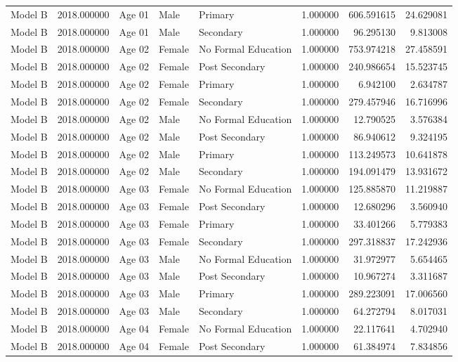 \begin{table}[ht]
\begin{tabular}{lrlllrrr}
Model B & 2018.000000 & Age 01 & Male & Primary & 1.000000 & 606.591615 & 24.629081 \\
Model B & 2018.000000 & Age 01 & Male & Secondary & 1.000000 & 96.295130 & 9.813008 \\
Model B & 2018.000000 & Age 02 & Female & No Formal Education & 1.000000 & 753.974218 & 27.458591 \\
Model B & 2018.000000 & Age 02 & Female & Post Secondary & 1.000000 & 240.986654 & 15.523745 \\
Model B & 2018.000000 & Age 02 & Female & Primary & 1.000000 & 6.942100 & 2.634787 \\
Model B & 2018.000000 & Age 02 & Female & Secondary & 1.000000 & 279.457946 & 16.716996 \\
Model B & 2018.000000 & Age 02 & Male & No Formal Education & 1.000000 & 12.790525 & 3.576384 \\
Model B & 2018.000000 & Age 02 & Male & Post Secondary & 1.000000 & 86.940612 & 9.324195 \\
Model B & 2018.000000 & Age 02 & Male & Primary & 1.000000 & 113.249573 & 10.641878 \\
Model B & 2018.000000 & Age 02 & Male & Secondary & 1.000000 & 194.091479 & 13.931672 \\
Model B & 2018.000000 & Age 03 & Female & No Formal Education & 1.000000 & 125.885870 & 11.219887 \\
Model B & 2018.000000 & Age 03 & Female & Post Secondary & 1.000000 & 12.680296 & 3.560940 \\
Model B & 2018.000000 & Age 03 & Female & Primary & 1.000000 & 33.401266 & 5.779383 \\
Model B & 2018.000000 & Age 03 & Female & Secondary & 1.000000 & 297.318837 & 17.242936 \\
Model B & 2018.000000 & Age 03 & Male & No Formal Education & 1.000000 & 31.972977 & 5.654465 \\
Model B & 2018.000000 & Age 03 & Male & Post Secondary & 1.000000 & 10.967274 & 3.311687 \\
Model B & 2018.000000 & Age 03 & Male & Primary & 1.000000 & 289.223091 & 17.006560 \\
Model B & 2018.000000 & Age 03 & Male & Secondary & 1.000000 & 64.272794 & 8.017031 \\
Model B & 2018.000000 & Age 04 & Female & No Formal Education & 1.000000 & 22.117641 & 4.702940 \\
Model B & 2018.000000 & Age 04 & Female & Post Secondary & 1.000000 & 61.384974 & 7.834856 \\

\end{tabular}
\end{table}
